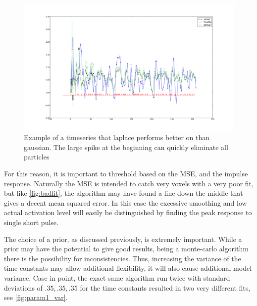 \begin{figure}
\includegraphics[clip=true,trim=10cm 4cm 10cm 4cm, width=16cm]{images/active_difficult}
\caption{Example of a timeseries that laplace performs better on than
gaussian. The large spike at the beginning can quickly eliminate all particles} 
\label{fig:highhard}

\end{figure}

For this reason, it is important to threshold based on the MSE, and the
impulse response. Naturally the MSE is intended to catch very voxels with a
very poor fit,
but like \autoref{fig:badfit}, the algorithm may have found a line
down the middle that gives a decent mean squared error. In this case
the excessive smoothing and low actual activation level will easily
be distinguished by finding the peak response to single short pulse. 

The choice of a prior, as discussed previously, is extremely important. While a
prior may have the potential to give good results, being a monte-carlo algorithm
there is the possibility for inconsistencies. Thus, increasing the variance
of the time-constants may allow additional flexibility, it will also cause
additional model variance. Case in point, the exact same algorithm run twice
with standard deviations of $.35, .35, .35$ for the time constants resulted in two
very different fits, see \autoref{fig:param1_var}.

